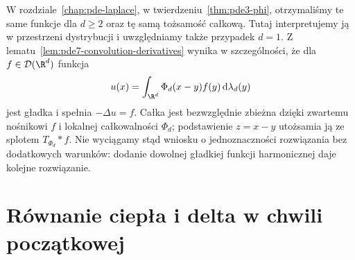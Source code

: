 \begin{uwaga}
W rozdziale~\ref{chap:pde-laplace},
w twierdzeniu~\ref{thm:pde3-phi}, otrzymaliśmy te same
funkcje dla $d\ge2$ oraz tę samą tożsamość całkową.
Tutaj interpretujemy ją w przestrzeni dystrybucji
i uwzględniamy także przypadek $d=1$.
Z lematu~\ref{lem:pde7-convolution-derivatives}
wynika w szczególności, że dla $f\in\mathcal D(\R^d)$
funkcja
\[
 u(x)=\int_{\R^d}\Phi_d(x-y)f(y)\,\mathrm d\lambda_d(y)
\]
jest gładka i spełnia $-\Delta u=f$.
Całka jest bezwzględnie zbieżna dzięki zwartemu
nośnikowi $f$ i lokalnej całkowalności $\Phi_d$;
podstawienie $z=x-y$ utożsamia ją ze splotem
$T_{\Phi_d}*f$. Nie wyciągamy stąd wniosku
o jednoznaczności rozwiązania bez dodatkowych
warunków: dodanie dowolnej gładkiej funkcji
harmonicznej daje kolejne rozwiązanie.
\end{uwaga}

\section{Równanie ciepła i delta w chwili początkowej}
\label{sec:pde7-heat}

